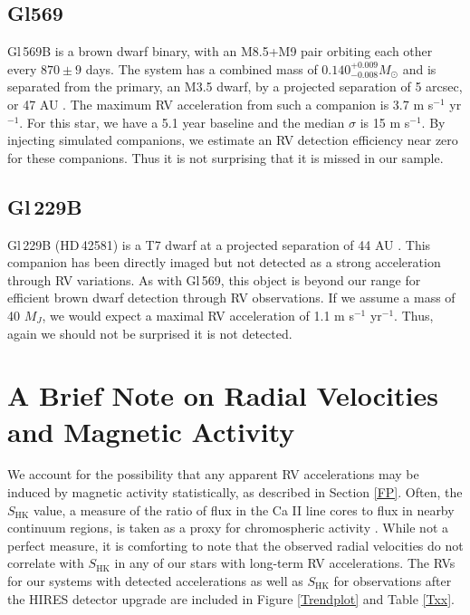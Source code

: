 \subsection{Gl569}
Gl\,569B is a brown dwarf binary, with an M8.5+M9 pair orbiting each other every $870 \pm 9$ days. The system has a combined mass of $0.140^{+0.009}_{-0.008} M_\odot$ \citep{Dupuy10} and is separated from the primary, an M3.5 dwarf, by a projected separation of 5 arcsec, or 47 AU \citep{Femenia11}. The maximum RV acceleration from such a companion is 3.7 m s$^{-1}$ yr$^{-1}$. For this star, we have a 5.1 year baseline and the median $\sigma$ is 15 m s$^{-1}$. By injecting simulated companions, we estimate an RV detection efficiency near zero for these companions. Thus it is not surprising that it is missed in our sample. 

\subsection{Gl\,229B}
Gl\,229B (HD\,42581) is a T7 dwarf at a projected separation of 44 AU \citep{Faherty09}. This companion has been directly imaged \citep{Nakajima95} but not detected as a strong acceleration through RV variations. As with Gl\,569, this object is beyond our range for efficient brown dwarf detection through RV observations. If we assume a mass of 40 $M_J$, we would expect a maximal RV acceleration of 1.1 m s$^{-1}$ yr$^{-1}$. Thus, again we should not be surprised it is not detected.

\section{A Brief Note on Radial Velocities and Magnetic Activity}
We account for the possibility that any apparent RV accelerations may be induced by magnetic activity statistically, as described in Section \ref{FP}. Often, the $S_\textrm{HK}$ value, a measure of the ratio of flux in the Ca II line cores to flux in nearby continuum regions, is taken as a proxy for chromospheric activity \citep{Wilson68, Henry96}. While not a perfect measure, it is comforting to note that the observed radial velocities do not correlate with $S_\textrm{HK}$ in any of our stars with long-term RV accelerations. The RVs for our systems with detected accelerations as well as $S_\textrm{HK}$ for observations after the HIRES detector upgrade are included in Figure \ref{Trendplot} and Table \ref{Txx}. 

